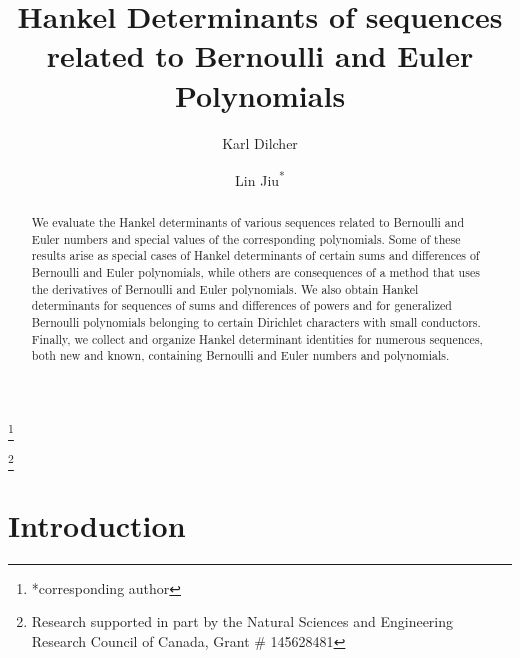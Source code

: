 \documentclass{amsart}
\theoremstyle{plain}
\numberwithin{equation}{section}
\begin{document}
\title[Hankel Determinants of Bernoulli and Euler Polynomials]{Hankel Determinants of sequences related to Bernoulli and Euler Polynomials}

\author{Karl Dilcher}
\address{Department of Mathematics and Statistics\\
         Dalhousie University\\
         Halifax, Nova Scotia, B3H 4R2, Canada}

\author[Lin Jiu]{Lin Jiu\textsuperscript{*}}
\thanks{*corresponding author}
\address{Department of Mathematics and Statistics\\
         Dalhousie University\\
         Halifax, Nova Scotia, B3H 4R2, Canada}

\thanks{Research supported in part by the Natural Sciences and Engineering
        Research Council of Canada, Grant \# 145628481}


\date{}

\setcounter{equation}{0}

\begin{abstract}
We evaluate the Hankel determinants of various sequences related to Bernoulli
and Euler numbers and special values of the corresponding polynomials. Some of
these results arise as special cases of Hankel determinants of certain sums 
and differences of Bernoulli and Euler polynomials, while others are 
consequences of a method that uses the derivatives of Bernoulli and Euler
polynomials. We also obtain Hankel determinants for sequences of sums and differences 
of powers and for generalized Bernoulli polynomials belonging to certain Dirichlet
characters with small conductors. Finally, we collect and organize Hankel
determinant identities for numerous sequences, both new and known, containing
Bernoulli and Euler numbers and polynomials.
\end{abstract}

\maketitle

\section{Introduction}
\end{document}
